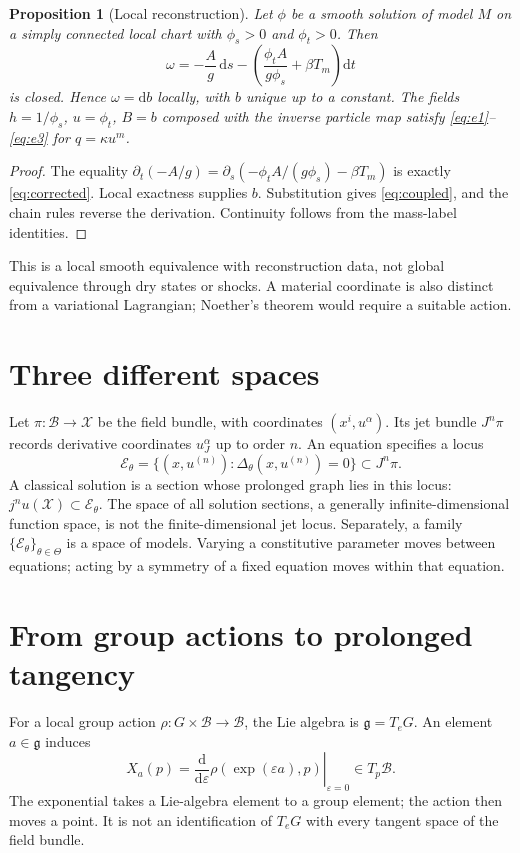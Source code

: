 \documentclass[11pt,a4paper,oneside]{report}
\numberwithin{equation}{chapter}
\newtheorem{proposition}[theorem]{Proposition}
\newcommand{\E}{\mathcal E}
\newcommand{\dd}{\mathrm d}
\begin{document}
\begin{proposition}[Local reconstruction]\label{prop:reconstruct}
Let $\phi$ be a smooth solution of model $M$ on a simply connected local chart with $\phi_s>0$ and $\phi_t>0$. Then
\begin{equation}\label{eq:bedform}
\omega=-\frac{A}{g}\,\dd s-
\left(\frac{\phi_tA}{g\phi_s}+\beta T_m\right)\dd t
\end{equation}
is closed. Hence $\omega=\dd b$ locally, with $b$ unique up to a constant. The fields $h=1/\phi_s$, $u=\phi_t$, $B=b$ composed with the inverse particle map satisfy \eqref{eq:e1}--\eqref{eq:e3} for $q=\kappa u^m$.
\end{proposition}
\begin{proof}
The equality $\partial_t(-A/g)=\partial_s(-\phi_tA/(g\phi_s)-\beta T_m)$ is exactly \eqref{eq:corrected}. Local exactness supplies $b$. Substitution gives \eqref{eq:coupled}, and the chain rules reverse the derivation. Continuity follows from the mass-label identities.\end{proof}
This is a local smooth equivalence with reconstruction data, not global equivalence through dry states or shocks. A material coordinate is also distinct from a variational Lagrangian; Noether's theorem would require a suitable action.



\section{Three different spaces}
Let $\pi:\mathcal B\to\mathcal X$ be the field bundle, with coordinates $(x^i,u^\alpha)$. Its jet bundle $J^n\pi$ records derivative coordinates $u^\alpha_J$ up to order $n$. An equation specifies a locus
\begin{equation}
\E_\theta=\{(x,u^{(n)}):\Delta_\theta(x,u^{(n)})=0\}\subset J^n\pi.
\end{equation}
A classical solution is a section whose prolonged graph lies in this locus: $j^nu(\mathcal X)\subset\E_\theta$. The space of all solution sections, a generally infinite-dimensional function space, is not the finite-dimensional jet locus. Separately, a family $\{\E_\theta\}_{\theta\in\Theta}$ is a space of models. Varying a constitutive parameter moves between equations; acting by a symmetry of a fixed equation moves within that equation.

\section{From group actions to prolonged tangency}
For a local group action $\rho:G\times\mathcal B\to\mathcal B$, the Lie algebra is $\mathfrak g=T_eG$. An element $a\in\mathfrak g$ induces
\begin{equation}
X_a(p)=\left.\frac{\dd}{\dd\varepsilon}\rho(\exp(\varepsilon a),p)\right|_{\varepsilon=0}\in T_p\mathcal B.
\end{equation}
The exponential takes a Lie-algebra element to a group element; the action then moves a point. It is not an identification of $T_eG$ with every tangent space of the field bundle.
\end{document}
